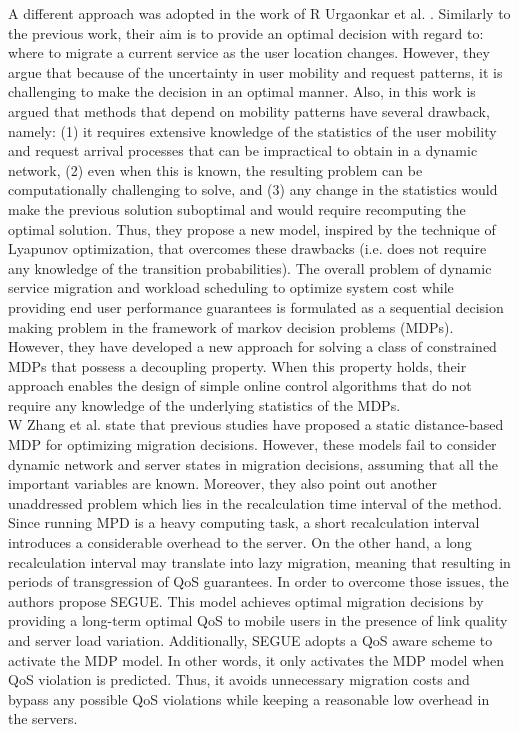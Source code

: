 \noindent\tab A different approach was adopted in the work of R Urgaonkar et al. \cite{urgaonkar2015dynamic}. Similarly to the previous work, their aim is to provide an optimal decision with regard to: where to migrate a current service as the user location changes. However, they argue that because of the uncertainty in user mobility and request patterns, it is challenging to make the decision in an optimal manner. Also, in this work is argued that methods that depend on mobility patterns have several drawback, namely: (1) it requires extensive knowledge of the statistics of the user mobility and request arrival processes that can be impractical to obtain in a dynamic network, (2) even when this is known, the resulting problem can be computationally challenging to solve, and (3) any change in the statistics would make the previous solution suboptimal and would require recomputing the optimal solution. Thus, they propose a new model, inspired by the technique of Lyapunov optimization, that overcomes these drawbacks (i.e. does not require any knowledge of the transition probabilities). The overall problem of dynamic service migration and workload scheduling to optimize system cost while providing end user performance guarantees is formulated as a sequential decision making problem in the framework of markov decision problems (MDPs). However, they have developed a new approach for solving a class of constrained MDPs that possess a decoupling property. When this property holds, their approach enables the design of simple online control algorithms that do not require any knowledge of the underlying statistics of the MDPs.\\
\noindent\tab W Zhang et al. \cite{zhang2016segue} state that previous studies have proposed a static distance-based MDP for optimizing migration decisions. However, these models fail to consider dynamic network and server states in migration decisions, assuming that all the important variables are known. Moreover, they also point out another unaddressed problem which lies in the recalculation time interval of the method. Since running MPD is a heavy computing task, a short recalculation interval introduces a considerable overhead to the server. On the other hand, a long recalculation interval may translate into lazy migration, meaning that resulting in periods of transgression of QoS guarantees. In order to overcome those issues, the authors propose SEGUE. This model achieves optimal migration decisions by providing a long-term optimal QoS to mobile users in the presence of link quality and server load variation. Additionally, SEGUE adopts a QoS aware scheme to activate the MDP model. In other words, it only activates the MDP model when QoS violation is predicted. Thus, it avoids unnecessary migration costs and bypass any possible QoS violations while keeping a reasonable low overhead in the servers.\\
